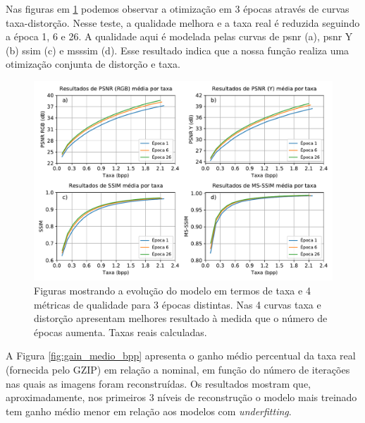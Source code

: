 Nas figuras em \ref{fig:metricas_3ep} podemos observar a otimização em 3 épocas através de curvas taxa-distorção. Nesse teste, a qualidade melhora e a taxa real é reduzida seguindo a época 1, 6 e 26. A qualidade aqui é modelada pelas curvas de \acrshort{psnr} (a), \acrshort{psnr} Y (b)  \acrshort{ssim} (c) e  \acrshort{msssim} (d). Esse resultado indica que a nossa função realiza uma otimização conjunta de distorção e taxa. 

\begin{figure}
	\centering
	\includegraphics[width=1\textwidth]{figuras/result_3ep.pdf}
	\caption[Curvas de qualidade por taxa em 3 épocas distintas]{Figuras mostrando a evolução do modelo em termos de taxa e 4 métricas de qualidade para 3 épocas distintas. Nas 4 curvas taxa e distorção apresentam melhores resultado à medida que o número de épocas aumenta. Taxas reais calculadas. }  	
	\label{fig:metricas_3ep}
\end{figure}

A Figura \ref{fig:gain_medio_bpp} apresenta o ganho médio percentual da taxa real (fornecida pelo GZIP) em relação a nominal, em  função do número de iterações nas quais as imagens foram reconstruídas. Os resultados mostram que, aproximadamente, nos primeiros 3 níveis de reconstrução o modelo mais treinado tem ganho médio menor em relação aos modelos com \textit{underfitting}.  


